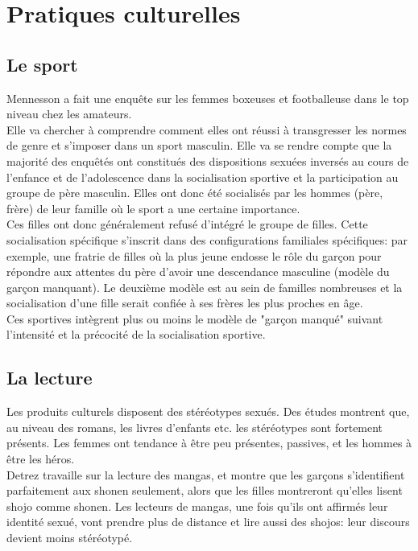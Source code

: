 \documentclass[10pt, a4paper, openany]{book}
\begin{document}
\section{Pratiques culturelles}

\subsection{Le sport}

Mennesson a fait une enquête sur les femmes boxeuses et footballeuse dans le top niveau chez les amateurs. \\
Elle va chercher à comprendre comment elles ont réussi à transgresser les normes de genre et s'imposer dans un sport masculin. Elle va se rendre compte que la majorité des enquêtés ont constitués des dispositions sexuées inversés au cours de l'enfance et de l'adolescence dans la socialisation sportive et la participation au groupe de père masculin. Elles ont donc été socialisés par les hommes (père, frère) de leur famille où le sport a une certaine importance. \\
Ces filles ont donc généralement refusé d'intégré le groupe de filles. Cette socialisation spécifique s'inscrit dans des configurations familiales spécifiques: par exemple, une fratrie de filles où la plus jeune endosse le rôle du garçon pour répondre aux attentes du père d'avoir une descendance masculine (modèle du garçon manquant). Le deuxième modèle est au sein de familles nombreuses et la socialisation d'une fille serait confiée à ses frères les plus proches en âge. \\
Ces sportives intègrent plus ou moins le modèle de "garçon manqué" suivant l'intensité et la précocité de la socialisation sportive. 

\subsection{La lecture}

Les produits culturels disposent des stéréotypes sexués. Des études montrent que, au niveau des romans, les livres d'enfants etc. les stéréotypes sont fortement présents. Les femmes ont tendance à être peu présentes, passives, et les hommes à être les héros. \\
Detrez travaille sur la lecture des mangas, et montre que les garçons s'identifient parfaitement aux shonen seulement, alors que les filles montreront qu'elles lisent shojo comme shonen. Les lecteurs de mangas, une fois qu'ils ont affirmés leur identité sexué, vont prendre plus de distance et lire aussi des shojos: leur discours devient moins stéréotypé. 
\end{document}
